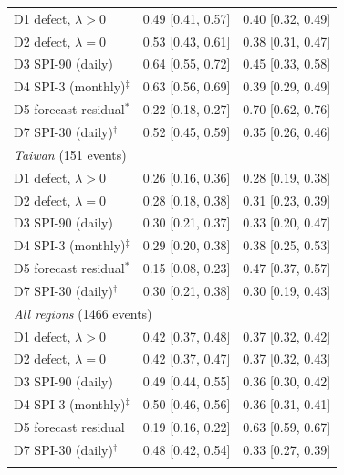 \begin{table}[tbp]
\begin{tabular*}{\textwidth}{@{\extracolsep\fill}lcc}
\quad D1 defect, $\lambda>0$ & 0.49 [0.41, 0.57] & 0.40 [0.32, 0.49] \\
\quad D2 defect, $\lambda=0$ & 0.53 [0.43, 0.61] & 0.38 [0.31, 0.47] \\
\quad D3 SPI-90 (daily) & 0.64 [0.55, 0.72] & 0.45 [0.33, 0.58] \\
\quad D4 SPI-3 (monthly)$^{\ddagger}$ & 0.63 [0.56, 0.69] & 0.39 [0.29, 0.49] \\
\quad D5 forecast residual$^{\ast}$ & 0.22 [0.18, 0.27] & 0.70 [0.62, 0.76] \\
\quad D7 SPI-30 (daily)$^{\dagger}$ & 0.52 [0.45, 0.59] & 0.35 [0.26, 0.46] \\
\midrule
\multicolumn{3}{l}{\textit{Taiwan} (151 events)}\\
\quad D1 defect, $\lambda>0$ & 0.26 [0.16, 0.36] & 0.28 [0.19, 0.38] \\
\quad D2 defect, $\lambda=0$ & 0.28 [0.18, 0.38] & 0.31 [0.23, 0.39] \\
\quad D3 SPI-90 (daily) & 0.30 [0.21, 0.37] & 0.33 [0.20, 0.47] \\
\quad D4 SPI-3 (monthly)$^{\ddagger}$ & 0.29 [0.20, 0.38] & 0.38 [0.25, 0.53] \\
\quad D5 forecast residual$^{\ast}$ & 0.15 [0.08, 0.23] & 0.47 [0.37, 0.57] \\
\quad D7 SPI-30 (daily)$^{\dagger}$ & 0.30 [0.21, 0.38] & 0.30 [0.19, 0.43] \\
\midrule
\multicolumn{3}{l}{\textit{All regions} (1466 events)}\\
\quad D1 defect, $\lambda>0$ & 0.42 [0.37, 0.48] & 0.37 [0.32, 0.42] \\
\quad D2 defect, $\lambda=0$ & 0.42 [0.37, 0.47] & 0.37 [0.32, 0.43] \\
\quad D3 SPI-90 (daily) & 0.49 [0.44, 0.55] & 0.36 [0.30, 0.42] \\
\quad D4 SPI-3 (monthly)$^{\ddagger}$ & 0.50 [0.46, 0.56] & 0.36 [0.31, 0.41] \\
\quad D5 forecast residual & 0.19 [0.16, 0.22] & 0.63 [0.59, 0.67] \\
\quad D7 SPI-30 (daily)$^{\dagger}$ & 0.48 [0.42, 0.54] & 0.33 [0.27, 0.39] \\
\botrule
\end{tabular*}
\end{table}
